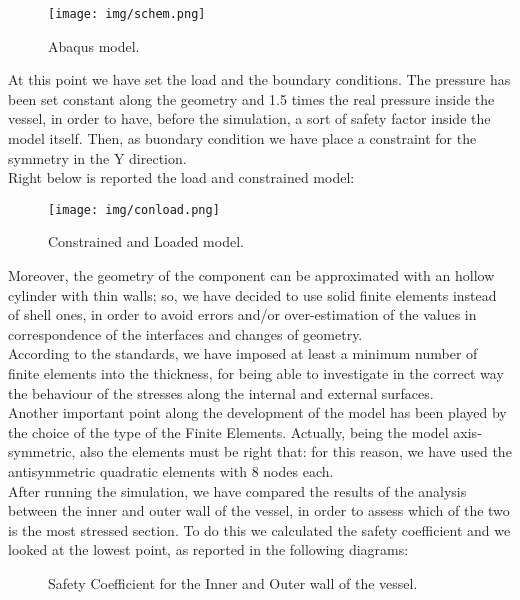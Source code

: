 \documentclass[a4paper,12pt]{article}
\begin{document}
\begin{figure}[H]
\centering
\texttt{[image: img/schem.png]}
\caption{Abaqus model.}
\end{figure}


At this point we have set the load and the boundary conditions. The pressure has been set constant along the geometry and 1.5 times the real pressure inside the vessel, in order to have, before the simulation, a sort of safety factor inside the model itself. Then, as buondary condition we have place a constraint for the symmetry in the Y direction.\\ Right below is reported the load and constrained model: 
\begin{figure}[H]
\centering
\texttt{[image: img/conload.png]}
\caption{Constrained and Loaded model.}
\end{figure}

Moreover, the geometry of the component can be approximated with an hollow cylinder with thin walls; so, we have decided to use solid finite elements instead of shell ones, in order to avoid errors and/or over-estimation of the values in correspondence of the interfaces and changes of geometry. \\
According to the standards, we have imposed at least a minimum number of finite elements into the thickness, for being able to investigate in the correct way the behaviour of the stresses along the internal and external surfaces.\\
Another important point along the development of the model has been played by the choice of the type of the Finite Elements. Actually, being the model axis-symmetric, also the elements must be right that: for this reason, we have used the antisymmetric quadratic elements with 8 nodes each.\\


After running the simulation, we have compared the results of the analysis between the inner and outer wall of the vessel, in order to assess which of the two is the most stressed section.
To do this we calculated the safety coefficient and we looked at the lowest point, as reported in the following diagrams:

\begin{figure}[H]
\centering     %
\caption{Safety Coefficient for the Inner and Outer wall of the vessel.}
\end{figure}
\end{document}
